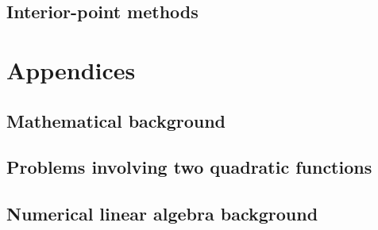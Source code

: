 \documentclass[11pt,oneside,a4paper]{book}
\theoremstyle{definition}
\DeclareRobustCommand{\[}{\begin{equation}}
\DeclareRobustCommand{\]}{\end{equation}}
\begin{document}
\chapter{Interior-point methods}

\appendix

\part*{Appendices}

\chapter{Mathematical background}

\chapter{Problems involving two quadratic functions}

\chapter{Numerical linear algebra background}

\small{

% 

\clearpage
{}
}
\printindex
{}
\end{document}
